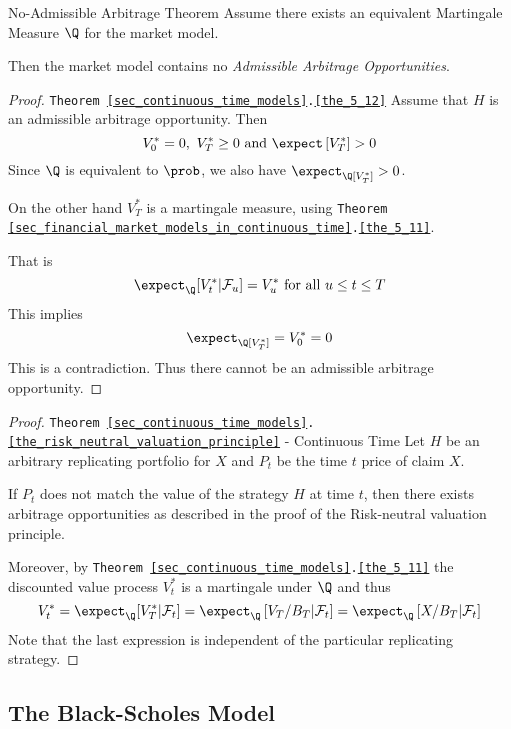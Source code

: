 \documentclass[11pt,a4paper]{article}
\begin{document}
  \begin{theorem}{No-Admissible Arbitrage Theorem}\label{the_5_12}
    Assume there exists an equivalent Martingale Measure $\Q$ for the market model.
    \par Then the market model contains no \textit{Admissible Arbitrage Opportunities}.
  \end{theorem}

  \begin{proof}{\texttt{Theorem \ref{sec_continuous_time_models}.\ref{the_5_12}}}
    Assume that $H$ is an admissible arbitrage opportunity. Then
    \[ V_0^*=0,\ V_T^*\geq0\text{ and }\expect\left[V_T^*\right]>0 \]
    Since $\Q$ is equivalent to $\prob$, we also have $\expect_\Q[V_T^*]>0$.
    \par On the other hand $V_T^*$ is a martingale measure, using \texttt{Theorem \ref{sec_financial_market_models_in_continuous_time}.\ref{the_5_11}}.
    \par That is
    \[ \expect_\Q[V_t^*|\mathcal{F}_u]=V_u^*\text{ for all }u\leq t\leq T \]
    This implies
    \[ \expect_\Q[V_T^*]=V_0^*=0 \]
    This is a contradiction. Thus there cannot be an admissible arbitrage opportunity.\proved
  \end{proof}

  \begin{proof}{\texttt{Theorem \ref{sec_continuous_time_models}.\ref{the_risk_neutral_valuation_principle}} - Continuous Time}
    Let $H$ be an arbitrary replicating portfolio for $X$ and $P_t$ be the time $t$ price of claim $X$.
    \par If $P_t$ does not match the value of the strategy $H$ at time $t$, then there exists arbitrage opportunities as described in the proof of the Risk-neutral valuation principle.
    \par Moreover, by \texttt{Theorem \ref{sec_continuous_time_models}.\ref{the_5_11}} the discounted value process $V_t^*$ is a martingale under $\Q$ and thus
    \[ V_t^*=\expect_\Q[V_T^*|\mathcal{F}_t]=\expect_\Q\left[V_T/B_T|\mathcal{F}_t\right]=\expect_\Q\left[X/B_T|\mathcal{F}_t\right] \]
    Note that the last expression is independent of the particular replicating strategy.\proved
  \end{proof}

\subsection{The Black-Scholes Model}
\end{document}
